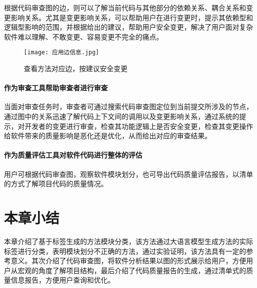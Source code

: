 根据代码审查图的边，则可以了解当前代码与其他部分的依赖关系、耦合关系和变更影响关系。尤其是变更影响关系，可以帮助用户在进行变更时，提示其依赖型和逻辑型影响的范围，并根据给出的建议，帮助用户安全变更，解决了用户面对复杂软件难以理解、不敢变更、容易变更不完全的痛点。

\begin{figure}[h]
\centering
\texttt{[image: 应用边信息.jpg]}
\caption{查看方法对应边，按建议安全变更}
\end{figure}

\paragraph{作为审查工具帮助审查者进行审查} 当面对审查任务时，审查者可通过搜索代码审查图定位到当前提交所涉及的节点，通过图中的关系迅速了解代码上下文间的调用以及变更影响关系，通过系统的提示，对开发者的变更进行审查，检查其功能逻辑上是否安全变更，检查其变更操作给软件带来的质量影响是恶化还是优化，从而给出对应的审查结果。

\paragraph{作为质量评估工具对软件代码进行整体的评估} 用户可根据代码审查图，观察软件模块划分，也可导出代码质量评估报告，以清单的方式了解项目代码的质量情况。



\section{本章小结}

本章介绍了基于标签生成的方法模块分类，该方法通过大语言模型生成方法的实际标签进行分类，表明模块划分不正确的方法，通过实验证明，该方法具有一定的参考意义。其次介绍了代码审查图，将软件分析结果以图的形式展示给用户，方便用户从宏观的角度了解项目结构，最后介绍了代码质量报告的生成，通过清单式的质量信息报告，方便用户查询和优化。
